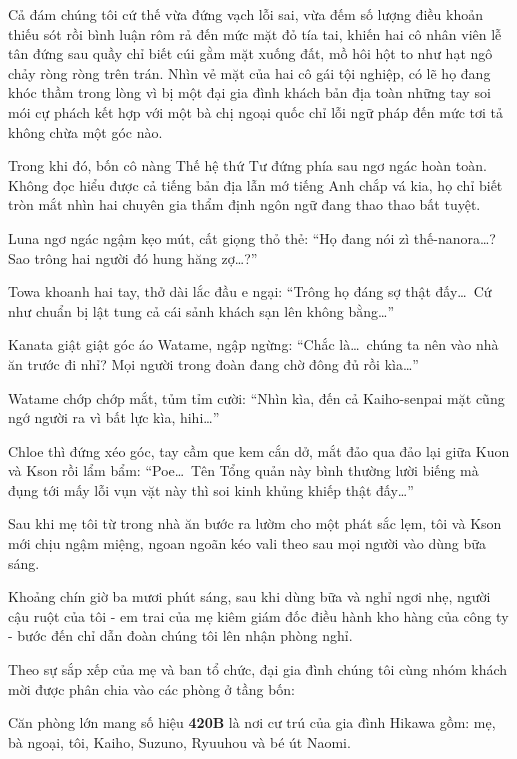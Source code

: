 \documentclass[../main.tex]{subfiles}
\begin{document}
Cả đám chúng tôi cứ thế vừa đứng vạch lỗi sai, vừa đếm số lượng điều khoản thiếu sót rồi bình luận rôm rả đến mức mặt đỏ tía tai, khiến hai cô nhân viên lễ tân đứng sau quầy chỉ biết cúi gằm mặt xuống đất, mồ hôi hột to như hạt ngô chảy ròng ròng trên trán. Nhìn vẻ mặt của hai cô gái tội nghiệp, có lẽ họ đang khóc thầm trong lòng vì bị một đại gia đình khách bản địa toàn những tay soi mói cự phách kết hợp với một bà chị ngoại quốc chỉ lỗi ngữ pháp đến mức tơi tả không chừa một góc nào.

Trong khi đó, bốn cô nàng Thế hệ thứ Tư đứng phía sau ngơ ngác hoàn toàn. Không đọc hiểu được cả tiếng bản địa lẫn mớ tiếng Anh chắp vá kia, họ chỉ biết tròn mắt nhìn hai chuyên gia thẩm định ngôn ngữ đang thao thao bất tuyệt.

Luna ngơ ngác ngậm kẹo mút, cất giọng thỏ thẻ: ``Họ đang nói zì thế-nanora\dots? Sao trông hai người đó hung hăng zợ\dots?''

Towa khoanh hai tay, thở dài lắc đầu e ngại: ``Trông họ đáng sợ thật đấy\dots\ Cứ như chuẩn bị lật tung cả cái sảnh khách sạn lên không bằng\dots''

Kanata giật giật góc áo Watame, ngập ngừng: ``Chắc là\dots\ chúng ta nên vào nhà ăn trước đi nhỉ? Mọi người trong đoàn đang chờ đông đủ rồi kìa\dots''

Watame chớp chớp mắt, tủm tỉm cười: ``Nhìn kìa, đến cả Kaiho-senpai mặt cũng ngớ người ra vì bất lực kìa, hihi\dots''

Chloe thì đứng xéo góc, tay cầm que kem cắn dở, mắt đảo qua đảo lại giữa Kuon và Kson rồi lẩm bẩm: ``Poe\dots\ Tên Tổng quản này bình thường lười biếng mà đụng tới mấy lỗi vụn vặt này thì soi kinh khủng khiếp thật đấy\dots''

Sau khi mẹ tôi từ trong nhà ăn bước ra lườm cho một phát sắc lẹm, tôi và Kson mới chịu ngậm miệng, ngoan ngoãn kéo vali theo sau mọi người vào dùng bữa sáng.

\ct

Khoảng chín giờ ba mươi phút sáng, sau khi dùng bữa và nghỉ ngơi nhẹ, người cậu ruột của tôi - em trai của mẹ kiêm giám đốc điều hành kho hàng của công ty - bước đến chỉ dẫn đoàn chúng tôi lên nhận phòng nghỉ.

Theo sự sắp xếp của mẹ và ban tổ chức, đại gia đình chúng tôi cùng nhóm khách mời được phân chia vào các phòng ở tầng bốn:

Căn phòng lớn mang số hiệu \textbf{420B} là nơi cư trú của gia đình Hikawa gồm: mẹ, bà ngoại, tôi, Kaiho, Suzuno, Ryuuhou và bé út Naomi.
\end{document}
